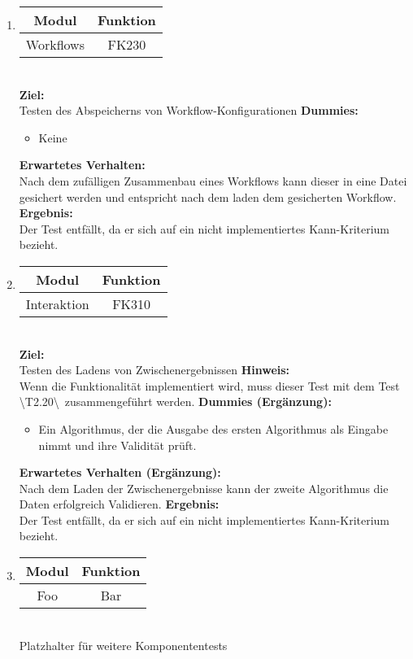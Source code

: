 \begin{enumerate}[align=left, leftmargin=4em, label={\textbf{\textbackslash T2.\arabic*\textbackslash}} ]
		\\\item \begin{tabular}{|c|c|}
			\hline Modul & Funktion \\
			\hline Workflows & FK230 \\
			\hline
		\end{tabular}\\
		\subitem \textbf{Ziel:}\\ Testen des Abspeicherns von Workflow-Konfigurationen
		\subitem \textbf{Dummies:} \begin{itemize}
			\item Keine
		\end{itemize}
		\subitem \textbf{Erwartetes Verhalten:}\\ Nach dem zufälligen Zusammenbau eines Workflows kann dieser in eine Datei gesichert werden und entspricht nach dem laden dem gesicherten Workflow.
		\subitem \textbf{Ergebnis:}\\
		Der Test entfällt, da er sich auf ein nicht implementiertes Kann-Kriterium bezieht.
		\\\item \begin{tabular}{|c|c|}
			\hline Modul & Funktion \\
			\hline Interaktion & FK310 \\
			\hline
		\end{tabular}\\
		\subitem \textbf{Ziel:}\\ Testen des Ladens von Zwischenergebnissen
		\subitem \textbf{Hinweis:}\\ Wenn die Funktionalität implementiert wird, muss dieser Test mit dem Test \textbackslash T2.20\textbackslash zusammengeführt werden.
		\subitem \textbf{Dummies (Ergänzung):}\begin{itemize}
			\item Ein Algorithmus, der die Ausgabe des ersten Algorithmus als Eingabe nimmt und ihre Validität prüft.
		\end{itemize}
		\subitem \textbf{Erwartetes Verhalten (Ergänzung):}\\ Nach dem Laden der Zwischenergebnisse kann der zweite Algorithmus die Daten erfolgreich Validieren.
		\subitem \textbf{Ergebnis:}\\
		Der Test entfällt, da er sich auf ein nicht implementiertes Kann-Kriterium bezieht.
		\\\item \begin{tabular}{|c|c|}
			\hline Modul & Funktion \\
			\hline Foo & Bar \\
			\hline
		\end{tabular}\\
		\subitem Platzhalter für weitere Komponententests
	\end{enumerate}

